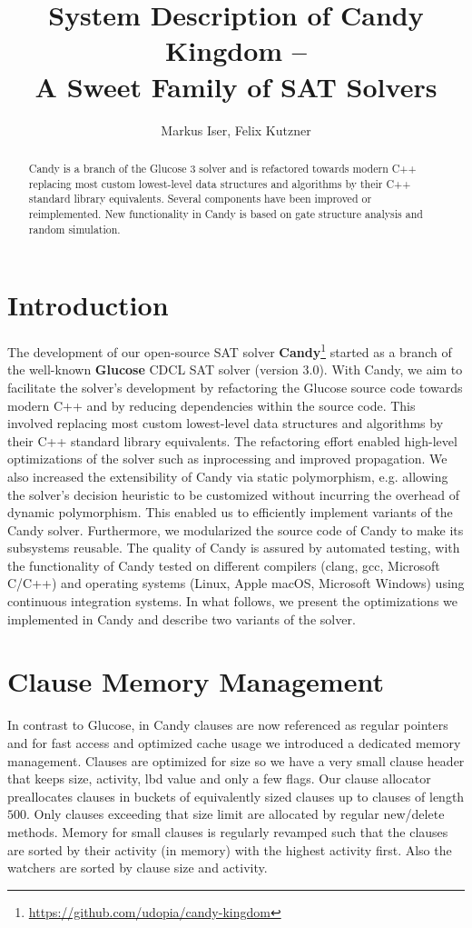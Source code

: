\documentclass[conference]{IEEEtran}
\title{System Description of Candy Kingdom --\\ A Sweet Family of SAT Solvers}
\author{Markus Iser, Felix Kutzner}
\begin{document}
\maketitle

\begin{abstract}
Candy is a branch of the Glucose 3 solver and is refactored towards modern C++ replacing most custom lowest-level data structures and algorithms by their C++ standard library equivalents. Several components have been improved or reimplemented. New functionality in Candy is based on gate structure analysis and random simulation. 
\end{abstract}

\section{Introduction}

The development of our open-source SAT solver \textbf{Candy}\footnote{\url{https://github.com/udopia/candy-kingdom}} started as a branch of the well-known \textbf{Glucose} \cite{Audemard:2009:Glucose} CDCL SAT solver (version 3.0).
With Candy, we aim to facilitate the solver's development by refactoring the Glucose source code towards modern C++ and by reducing dependencies within the source code.
This involved replacing most custom lowest-level data structures and algorithms by their C++ standard library equivalents.
The refactoring effort enabled high-level optimizations of the solver such as inprocessing and improved propagation.
We also increased the extensibility of Candy via static polymorphism, e.g. allowing the solver's decision heuristic to be customized without incurring the overhead of dynamic polymorphism. This enabled us to efficiently implement variants of the Candy solver.
Furthermore, we modularized the source code of Candy to make its subsystems reusable.
The quality of Candy is assured by automated testing, with the functionality of Candy tested on different compilers (clang, gcc, Microsoft C/C++) and operating systems (Linux, Apple macOS, Microsoft Windows) using continuous integration systems.
In what follows, we present the optimizations we implemented in Candy and describe two variants of the solver.

\section{Clause Memory Management}
\label{sec:clauses}

In contrast to Glucose, in Candy clauses are now referenced as regular pointers and for fast access and optimized cache usage we introduced a dedicated memory management. Clauses are optimized for size so we have a very small clause header that keeps size, activity, lbd value and only a few flags. Our clause allocator preallocates clauses in buckets of equivalently sized clauses up to clauses of length $500$. Only clauses exceeding that size limit are allocated by regular new/delete methods. Memory for small clauses is regularly revamped such that the clauses are sorted by their activity (in memory) with the highest activity first. Also the watchers are sorted by clause size and activity. 
\end{document}
